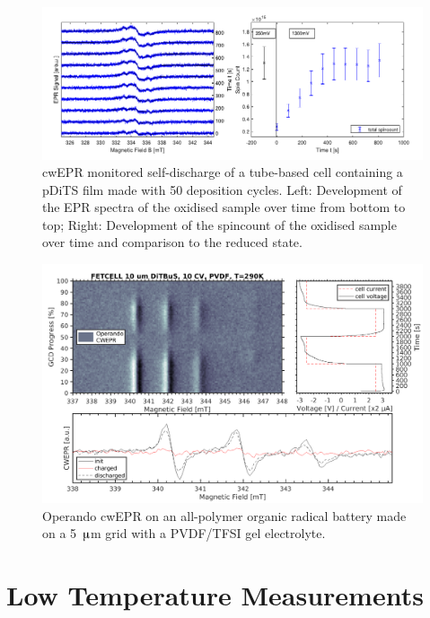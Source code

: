 \begin{figure}[h]
\center
	\includegraphics[width=1\textwidth]{./operando_epr/figures/self_discharge/DOM_DITS_SELF_DISCHARGE.pdf}
	\caption{cwEPR monitored self-discharge of a tube-based cell containing a pDiTS film made with 50 deposition cycles. Left: Development of the EPR spectra of the oxidised sample over time from bottom to top; Right: Development of the spincount of the oxidised sample over time and comparison to the reduced state.~\cite{DOM}}
	\label{fig:self_discharge_DOM}
\end{figure}





\begin{figure}[h]
\center
	\includegraphics[width=1\textwidth]{./operando_epr/figures/solid/FET231114_5uA_RT.pdf}
	\caption{Operando cwEPR on an all-polymer organic radical battery made on a 5~$\muup$m grid with a PVDF/TFSI gel electrolyte.}
	\label{fig:operando_solid_battery}
\end{figure}

\section{Low Temperature Measurements}

